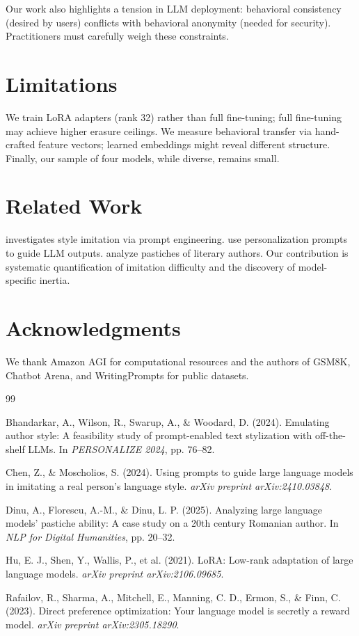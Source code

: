 \documentclass[11pt]{article}
\begin{document}
Our work also highlights a tension in LLM deployment: behavioral consistency (desired by users) conflicts with behavioral anonymity (needed for security). Practitioners must carefully weigh these constraints.

\section{Limitations}

We train LoRA adapters (rank 32) rather than full fine-tuning; full fine-tuning may achieve higher erasure ceilings. We measure behavioral transfer via hand-crafted feature vectors; learned embeddings might reveal different structure. Finally, our sample of four models, while diverse, remains small.

\section{Related Work}

\cite{bhandarkar2024emulating} investigates style imitation via prompt engineering. \cite{chen2024using} use personalization prompts to guide LLM outputs. \cite{dinu2025analyzing} analyze pastiches of literary authors. Our contribution is systematic quantification of imitation difficulty and the discovery of model-specific inertia.

\section*{Acknowledgments}

We thank Amazon AGI for computational resources and the authors of GSM8K, Chatbot Arena, and WritingPrompts for public datasets.

\begin{thebibliography}{99}

Bhandarkar, A., Wilson, R., Swarup, A., \& Woodard, D. (2024).
Emulating author style: A feasibility study of prompt-enabled text stylization with off-the-shelf LLMs.
In \textit{PERSONALIZE 2024}, pp. 76--82.

Chen, Z., \& Moscholios, S. (2024).
Using prompts to guide large language models in imitating a real person's language style.
\textit{arXiv preprint arXiv:2410.03848}.

Dinu, A., Florescu, A.-M., \& Dinu, L. P. (2025).
Analyzing large language models' pastiche ability: A case study on a 20th century Romanian author.
In \textit{NLP for Digital Humanities}, pp. 20--32.

Hu, E. J., Shen, Y., Wallis, P., et al. (2021).
LoRA: Low-rank adaptation of large language models.
\textit{arXiv preprint arXiv:2106.09685}.

Rafailov, R., Sharma, A., Mitchell, E., Manning, C. D., Ermon, S., \& Finn, C. (2023).
Direct preference optimization: Your language model is secretly a reward model.
\textit{arXiv preprint arXiv:2305.18290}.

\end{thebibliography}
\end{document}
